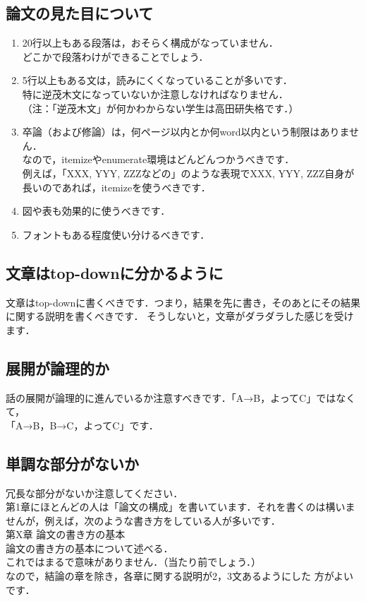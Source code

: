 \subsection{論文の見た目について}
\begin{minipage}{\hsize}
\begin{enumerate}
\setlength{\itemsep}{0.8\parindent}
\item 20行以上もある段落は，おそらく構成がなっていません．\\
      どこかで段落わけができることでしょう．
\item 5行以上もある文は，読みにくくなっていることが多いです．\\
      特に逆茂木文になっていないか注意しなければなりません．\\
      （注：「逆茂木文」が何かわからない学生は高田研失格です．）
\item 卒論（および修論）は，何ページ以内とか何word以内という制限はありません．\\
      なので，itemizeやenumerate環境はどんどんつかうべきです．\\
      例えば，「XXX, YYY, ZZZなどの」のような表現でXXX, YYY, ZZZ自身が長いのであれば，itemizeを使うべきです．
\item 図や表も効果的に使うべきです．
\item フォントもある程度使い分けるべきです．
\end{enumerate}
\end{minipage}

\subsection{文章はtop-downに分かるように}
文章はtop-downに書くべきです．つまり，結果を先に書き，そのあとにその結果に関する説明を書くべきです．
そうしないと，文章がダラダラした感じを受けます．

\subsection{展開が論理的か}
話の展開が論理的に進んでいるか注意すべきです．「A→B，よってC」ではなくて，\\「A→B，B→C，よってC」です．

\subsection{単調な部分がないか}
冗長な部分がないか注意してください．\\
第1章にほとんどの人は「論文の構成」を書いています．それを書くのは構いませんが，例えば，次のような書き方をしている人が多いです．\\
    第X章  論文の書き方の基本\\
        論文の書き方の基本について述べる．\\
  これではまるで意味がありません．（当たり前でしょう．）\\
  なので，結論の章を除き，各章に関する説明が2，3文あるようにした
  方がよいです．
  
